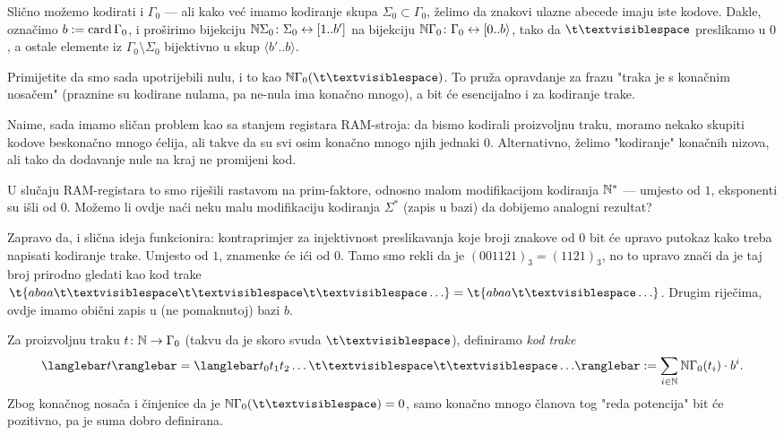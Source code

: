 Slično možemo kodirati i $\Gamma_0$ --- ali kako već imamo kodiranje skupa $\Sigma_0\subset\Gamma_0$, želimo da znakovi ulazne abecede imaju iste kodove. Dakle, označimo $b:=\operatorname{card}\Gamma_0$, i proširimo bijekciju ${\mathbb N}\Sigma_0\colon\Sigma_0\leftrightarrow[1..b']$ na bijekciju ${\mathbb N}\Gamma_0\colon\Gamma_0\leftrightarrow[0..b\rangle$, tako da $\bl$ preslikamo u $0$, a ostale elemente iz $\Gamma_0\!\setminus\Sigma_0$ bijektivno u skup $\langle b'\!..b\rangle$.

Primijetite da smo sada upotrijebili nulu, i to kao $\N\Gamma_0(\bl)$. To pruža opravdanje za frazu "traka je s konačnim nosačem" (praznine su kodirane nulama, pa ne-nula ima konačno mnogo), a bit će esencijalno i za kodiranje trake.

Naime, sada imamo sličan problem kao sa stanjem registara RAM-stroja: da bismo kodirali proizvoljnu traku, moramo nekako skupiti kodove beskonačno mnogo ćelija, ali takve da su svi osim konačno mnogo njih jednaki $0$. Alternativno, želimo "kodiranje" konačnih nizova, ali tako da dodavanje nule na kraj ne promijeni kod.

U slučaju RAM-registara to smo riješili rastavom na prim-faktore, odnosno malom modifikacijom kodiranja ${\mathbb N}^*$ --- umjesto od $1$, eksponenti su išli od $0$. Možemo li ovdje naći neku malu modifikaciju kodiranja $\Sigma^*$ (zapis u bazi) da dobijemo analogni rezultat?

Zapravo da, i slična ideja funkcionira: kontraprimjer za injektivnost preslikavanja koje broji znakove od $0$ bit će upravo putokaz kako treba napisati kodiranje trake. Umjesto od $1$, znamenke će ići od $0$. Tamo smo rekli da je $(001121)_3=(1121)_3$, no to upravo znači da je taj broj prirodno gledati kao kod trake $\t{abaa\bl\bl\bl\ldots}=\t{abaa\bl\ldots}$. Drugim riječima, ovdje imamo obični zapis u (ne pomaknutoj) bazi $b$.

\begin{definicija}[{name=[kodiranje trake Turingovog stroja]}]
Za proizvoljnu traku $t\colon{\mathbb N}\to\Gamma_0$ (takvu da je skoro svuda $\bl$), definiramo \emph{kod trake} \begin{equation}
    \knk{t}=\knk{t_0t_1t_2\ldots\bl\bl\ldots}:=\sum_{i\in\N}\N\Gamma_0(t_i)\cdot b^i\text.
\end{equation}
Zbog konačnog nosača i činjenice da je $\N\Gamma_0(\bl)=0$, samo konačno mnogo članova tog "reda potencija" bit će pozitivno, pa je suma dobro definirana.
\end{definicija}

